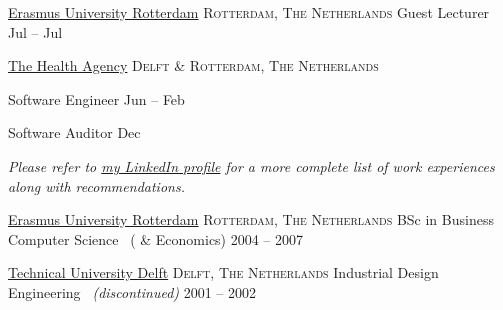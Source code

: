 \documentclass[10pt,a4paper]{article}
\begin{document}
\headedsection
  {\href{http://www.eur.nl}{Erasmus University Rotterdam}}
  {\textsc{Rotterdam, The Netherlands}} {%
  \headedsubsection
    {Guest Lecturer}
    {Jul  -- Jul }
    {}
}


\headedsection
  {
    \href{http://www.thehealthagency.com}{The Health Agency}
  }
  {\textsc{Delft \& Rotterdam, The Netherlands}} {%

  \headedsubsection
    {Software Engineer}
    {Jun  -- Feb }
    {}

  \headedsubsection
    {Software Auditor}
    {Dec }
    {}
}

\vspace{-0.2em}
\begin{center}
  \emph{\small Please refer to \href{http://www.linkedin.com/in/ciesbreijs}{my LinkedIn profile} for a more complete list of work experiences along with recommendations.}
\end{center}


\spacedhrule{-0.2em}{-0.4em}


\headedsection
  {\href{http://www.eur.nl/english}{Erasmus University Rotterdam}}
  {\textsc{Rotterdam, The Netherlands}} {%
  \headedsubsection
    {BSc in Business Computer Science \textnormal{~( \& Economics)}}
    {2004 -- 2007}
    {}
}

\headedsection
  {\href{http://www.tudelft.nl/en}{Technical University Delft}}
  {\textsc{Delft, The Netherlands}} {%
  \headedsubsection
    {Industrial Design Engineering \textnormal{\textit{~(discontinued)}}}
    {2001 -- 2002} {}
}
\end{document}
